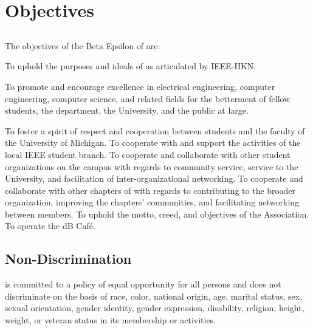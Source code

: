\chapter{Objectives}\label{sec:objectives}
\section{}
The objectives of the Beta Epsilon of \hkn are:


\begin{enumsubsection}

\itemnotoc To uphold the purposes and ideals of \hkn as articulated by IEEE-HKN.

\itemnotoc To promote and encourage excellence in electrical engineering, computer engineering, computer science, and related fields for the betterment of fellow students, the department, the University, and the public at large.

\itemnotoc To foster a spirit of respect and cooperation between students and the faculty of the University of Michigan.
\itemnotoc To cooperate with and support the activities of the local IEEE student branch.
\itemnotoc To cooperate and collaborate with other student organizations on the campus with regards to community service, service to the University, and facilitation of inter-organizational networking.
\itemnotoc To cooperate and collaborate with other chapters of \hkn with regards to contributing to the broader organization, improving the chapters' communities, and facilitating networking between \hkn members.
\itemnotoc To uphold the motto, creed, and objectives of the Association.
\itemnotoc To operate the dB Caf\'{e}.

\end{enumsubsection}

\section{Non-Discrimination}
\hkn is committed to a policy of equal opportunity for all persons and does not discriminate on the basis of race, color, national origin, age, marital status, sex, sexual orientation, gender identity, gender expression, disability, religion, height, weight, or veteran status in its membership or activities.

